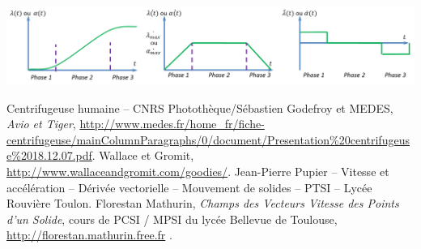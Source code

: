 \documentclass[10pt,oneside]{article}
\begin{document}
\begin{center}
\includegraphics[width=.95\textwidth]{png/loi2}
\end{center}



\begin{thebibliography}{2}
 Centrifugeuse humaine -- CNRS Photothèque/Sébastien Godefroy et MEDES, \textit{Avio et Tiger}, \url{http://www.medes.fr/home_fr/fiche-centrifugeuse/mainColumnParagraphs/0/document/Presentation%20centrifugeuse%2018.12.07.pdf}.
 Wallace et Gromit, \url{http://www.wallaceandgromit.com/goodies/}.
 Jean-Pierre Pupier -- Vitesse et accélération -- Dérivée vectorielle -- Mouvement de solides -- PTSI -- Lycée Rouvière Toulon.
 Florestan Mathurin, \textit{Champs des Vecteurs Vitesse des Points d’un Solide}, cours de PCSI / MPSI du lycée Bellevue de Toulouse, \url{http://florestan.mathurin.free.fr} .
\end{thebibliography}
\end{document}
